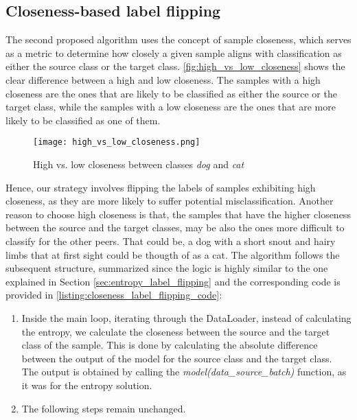 \subsection{Closeness-based label flipping}
The second proposed algorithm uses the concept of sample closeness, which serves as a metric to determine how closely a given sample aligns with classification as either the source class or the target class. \autoref{fig:high_vs_low_closeness} shows the clear difference between a high and low closeness. The samples with a high closeness are the ones that are likely to be classified as either the source or the target class, while the samples with a low closeness are the ones that are more likely to be classified as one of them.

\begin{figure}[h!]
        \centering
        \texttt{[image: high\_vs\_low\_closeness.png]}
        \caption{High vs. low closeness between classes \textit{dog} and \textit{cat}}
        \label{fig:high_vs_low_closeness}
\end{figure}

Hence, our strategy involves flipping the labels of samples exhibiting high closeness, as they are more likely to suffer potential misclassification. Another reason to choose high closeness is that, the samples that have the higher closeness between the source and the target classes, may be also the ones more difficult to classify for the other peers. That could be, a dog with a short snout and hairy limbs that at first sight could be thougth of as a cat.
The algorithm follows the subsequent structure, summarized since the logic is highly similar to the one explained in Section \ref{sec:entropy_label_flipping} and the corresponding code is provided in \autoref{listing:closeness_label_flipping_code}:
\begin{enumerate}
        \item Inside the main loop, iterating through the DataLoader, instead of calculating the entropy, we calculate the closeness between the source and the target class of the sample. This is done by calculating the absolute difference between the output of the model for the source class and the target class. The output is obtained by calling the \textit{model(data\_source\_batch)} function, as it was for the entropy solution.
        \item The following steps remain unchanged.
\end{enumerate}

